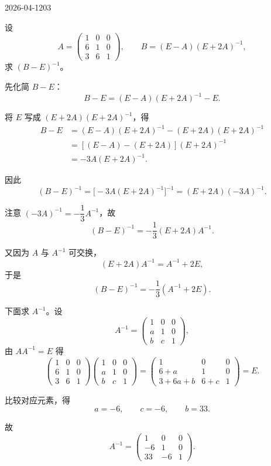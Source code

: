 \begin{mistake}{2026-04-12}{03}

\begin{problemcontent}
设
\[
A=\begin{pmatrix}
1&0&0\\
6&1&0\\
3&6&1
\end{pmatrix},
\qquad
B=(E-A)(E+2A)^{-1},
\]
求 \((B-E)^{-1}\)。

\end{problemcontent}

\begin{solutioncontent}
先化简 \(B-E\)：
\[
B-E=(E-A)(E+2A)^{-1}-E.
\]

将 \(E\) 写成 \((E+2A)(E+2A)^{-1}\)，得
\[
\begin{aligned}
B-E
&=(E-A)(E+2A)^{-1}-(E+2A)(E+2A)^{-1}\\
&=[(E-A)-(E+2A)](E+2A)^{-1}\\
&=-3A(E+2A)^{-1}.
\end{aligned}
\]

因此
\[
(B-E)^{-1}=\bigl[-3A(E+2A)^{-1}\bigr]^{-1}=(E+2A)(-3A)^{-1}.
\]

注意 \((-3A)^{-1}=-\dfrac13A^{-1}\)，故
\[
(B-E)^{-1}=-\frac13(E+2A)A^{-1}.
\]

又因为 \(A\) 与 \(A^{-1}\) 可交换，
\[
(E+2A)A^{-1}=A^{-1}+2E,
\]
于是
\[
(B-E)^{-1}=-\frac13(A^{-1}+2E).
\]

下面求 \(A^{-1}\)。设
\[
A^{-1}=\begin{pmatrix}
1&0&0\\
a&1&0\\
b&c&1
\end{pmatrix},
\]
由 \(AA^{-1}=E\) 得
\[
\begin{pmatrix}
1&0&0\\
6&1&0\\
3&6&1
\end{pmatrix}
\begin{pmatrix}
1&0&0\\
a&1&0\\
b&c&1
\end{pmatrix}
=
\begin{pmatrix}
1&0&0\\
6+a&1&0\\
3+6a+b&6+c&1
\end{pmatrix}
=E.
\]

比较对应元素，得
\[
a=-6,\qquad c=-6,\qquad b=33.
\]

故
\[
A^{-1}=\begin{pmatrix}
1&0&0\\
-6&1&0\\
33&-6&1
\end{pmatrix}.
\]


\end{solutioncontent}
\end{mistake}
